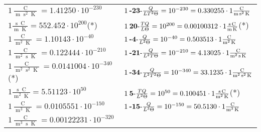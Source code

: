 \begin{center}
\begin{longtable}{l l}
{\color{black}$1 \bm{\mathrm{ }}\frac{\operatorname{C}}{\operatorname{m}\operatorname{s}^2\operatorname{K}} = 1.41250\cdot10^{-230} $}&
	{\color{black}$1\:\text{\textbf{-23}-} \frac{Q}{LT^2\Theta}=10^{-230} = 0.330255 \cdot 1 \bm{\mathrm{ }}\frac{\operatorname{C}}{\operatorname{m}\operatorname{s}^2\operatorname{K}}$}\\
{\color{black}$1 \bm{\mathrm{ }}\frac{\operatorname{s}\operatorname{C}}{\operatorname{m}\operatorname{K}} = 552.452\cdot10^{200} $}\quad(*)&
	{\color{black}$1\:\text{\textbf{20}-} \frac{TQ}{L\Theta}=10^{200} = 0.00100312 \cdot 1 \bm{\mathrm{ }}\frac{\operatorname{s}\operatorname{C}}{\operatorname{m}\operatorname{K}}$}\quad(*)\\
{\color{black}$1 \bm{\mathrm{ }}\frac{\operatorname{C}}{\operatorname{m}^2\operatorname{K}} = 1.10143\cdot10^{-40} $}&
	{\color{black}$1\:\text{\textbf{-4}-} \frac{Q}{L^2\Theta}=10^{-40} = 0.503513 \cdot 1 \bm{\mathrm{ }}\frac{\operatorname{C}}{\operatorname{m}^2\operatorname{K}}$}\\
{\color{black}$1 \bm{\mathrm{ }}\frac{\operatorname{C}}{\operatorname{m}^2\operatorname{s}\operatorname{K}} = 0.122444\cdot10^{-210} $}&
	{\color{black}$1\:\text{\textbf{-21}-} \frac{Q}{L^2T\Theta}=10^{-210} = 4.13025 \cdot 1 \bm{\mathrm{ }}\frac{\operatorname{C}}{\operatorname{m}^2\operatorname{s}\operatorname{K}}$}\\
{\color{black}$1 \bm{\mathrm{ }}\frac{\operatorname{C}}{\operatorname{m}^2\operatorname{s}^2\operatorname{K}} = 0.0141004\cdot10^{-340} $}\quad(*)&
	{\color{black}$1\:\text{\textbf{-34}-} \frac{Q}{L^2T^2\Theta}=10^{-340} = 33.1235 \cdot 1 \bm{\mathrm{ }}\frac{\operatorname{C}}{\operatorname{m}^2\operatorname{s}^2\operatorname{K}}$}\\
{\color{black}$1 \bm{\mathrm{ }}\frac{\operatorname{s}\operatorname{C}}{\operatorname{m}^2\operatorname{K}} = 5.51123\cdot10^{50} $}&
	{\color{black}$1\:\text{\textbf{5}-} \frac{TQ}{L^2\Theta}=10^{50} = 0.100451 \cdot 1 \bm{\mathrm{ }}\frac{\operatorname{s}\operatorname{C}}{\operatorname{m}^2\operatorname{K}}$}\quad(*)\\
{\color{black}$1 \bm{\mathrm{ }}\frac{\operatorname{C}}{\operatorname{m}^3\operatorname{K}} = 0.0105551\cdot10^{-150} $}&
	{\color{black}$1\:\text{\textbf{-15}-} \frac{Q}{L^3\Theta}=10^{-150} = 50.5130 \cdot 1 \bm{\mathrm{ }}\frac{\operatorname{C}}{\operatorname{m}^3\operatorname{K}}$}\\
{\color{black}$1 \bm{\mathrm{ }}\frac{\operatorname{C}}{\operatorname{m}^3\operatorname{s}\operatorname{K}} = 0.00122231\cdot10^{-320} $}&

\end{longtable}
\end{center}
